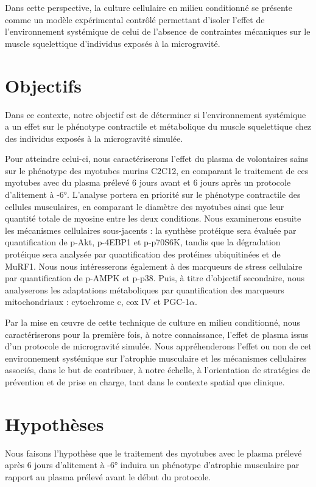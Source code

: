 \documentclass[11pt]{report}
\begin{document}
Dans cette perspective, la culture cellulaire en milieu conditionné se présente comme un modèle expérimental contrôlé permettant d'isoler l'effet de l'environnement systémique de celui de l'absence de contraintes mécaniques sur le muscle squelettique d'individus exposés à la microgravité. 

\section{Objectifs}

Dans ce contexte, notre objectif est de déterminer si l'environnement systémique a un effet sur le phénotype contractile et métabolique du muscle squelettique chez des individus exposés à la microgravité simulée.

Pour atteindre celui-ci, nous caractériserons l'effet du plasma de volontaires sains sur le phénotype des myotubes murins C2C12, en comparant le traitement de ces myotubes avec du plasma prélevé 6 jours avant et 6 jours après un protocole d'alitement à -6°. L'analyse portera en priorité sur le phénotype contractile des cellules musculaires, en comparant le diamètre des myotubes ainsi que leur quantité totale de myosine entre les deux conditions. Nous examinerons ensuite les mécanismes cellulaires sous-jacents : la synthèse protéique sera évaluée par quantification de p-Akt, p-4EBP1 et p-p70S6K, tandis que la dégradation protéique sera analysée par quantification des protéines ubiquitinées et de MuRF1. Nous nous intéresserons également à des marqueurs de stress cellulaire par quantification de p-AMPK et p-p38. Puis, à titre d'objectif secondaire, nous analyserons les adaptations métaboliques par quantification des marqueurs mitochondriaux : cytochrome c, cox IV et PGC-1$\alpha$.

Par la mise en œuvre de cette technique de culture en milieu conditionné, nous caractériserons pour la première fois, à notre connaissance, l'effet de plasma issus d'un protocole de microgravité simulée. Nous appréhenderons l'effet ou non de cet environnement systémique sur l'atrophie musculaire et les mécanismes cellulaires associés, dans le but de contribuer, à notre échelle, à l'orientation de stratégies de prévention et de prise en charge, tant dans le contexte spatial que clinique.

\section{Hypothèses}

Nous faisons l'hypothèse que le traitement des myotubes avec le plasma prélevé après 6 jours d'alitement à -6° induira un phénotype d'atrophie musculaire par rapport au plasma prélevé avant le début du protocole.
\end{document}

